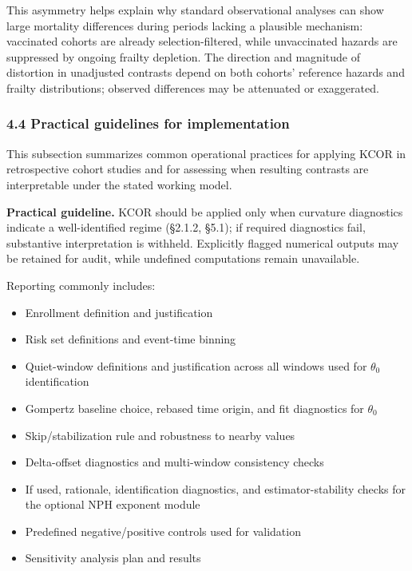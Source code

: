 \documentclass[
]{article}
\providecommand{\tightlist}{%
  \setlength{\itemsep}{0pt}\setlength{\parskip}{0pt}}
\begin{document}
This asymmetry helps explain why standard observational analyses can show large mortality differences during periods lacking a plausible mechanism: vaccinated cohorts are already selection-filtered, while unvaccinated hazards are suppressed by ongoing frailty depletion. The direction and magnitude of distortion in unadjusted contrasts depend on both cohorts' reference hazards and frailty distributions; observed differences may be attenuated or exaggerated.

\subsubsection{4.4 Practical guidelines for implementation}\label{practical-guidelines-for-implementation}

This subsection summarizes common operational practices for applying KCOR in retrospective cohort studies and for assessing when resulting contrasts are interpretable under the stated working model.

\textbf{Practical guideline.} KCOR should be applied only when curvature diagnostics indicate a well-identified regime (§2.1.2, §5.1); if required diagnostics fail, substantive interpretation is withheld. Explicitly flagged numerical outputs may be retained for audit, while undefined computations remain unavailable.

Reporting commonly includes:

\begin{itemize}
\tightlist
\item
  Enrollment definition and justification
\item
  Risk set definitions and event-time binning
\item
  Quiet-window definitions and justification across all windows used for \(\theta_0\) identification
\item
  Gompertz baseline choice, rebased time origin, and fit diagnostics for \(\theta_0\)
\item
  Skip/stabilization rule and robustness to nearby values
\item
  Delta-offset diagnostics and multi-window consistency checks
\item
  If used, rationale, identification diagnostics, and estimator-stability checks for the optional NPH exponent module
\item
  Predefined negative/positive controls used for validation
\item
  Sensitivity analysis plan and results
\end{itemize}
\end{document}
